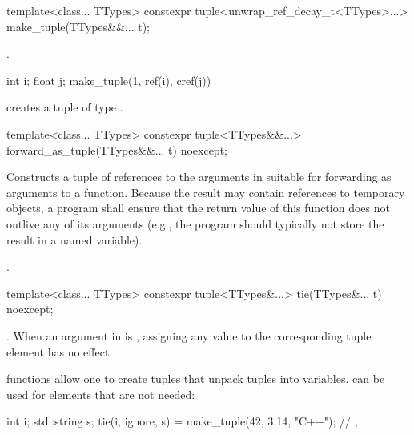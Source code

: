 %
%
\begin{itemdecl}
template<class... TTypes>
  constexpr tuple<unwrap_ref_decay_t<TTypes>...> make_tuple(TTypes&&... t);
\end{itemdecl}

\begin{itemdescr}
\pnum
\returns
{}.

\pnum
\begin{example}
\begin{codeblock}
int i; float j;
make_tuple(1, ref(i), cref(j))
\end{codeblock}
creates a tuple of type .
\end{example}
\end{itemdescr}

%
%
\begin{itemdecl}
template<class... TTypes>
  constexpr tuple<TTypes&&...> forward_as_tuple(TTypes&&... t) noexcept;
\end{itemdecl}

\begin{itemdescr}
\pnum
\effects
Constructs a tuple of references to the arguments in  suitable
for forwarding as arguments to a function. Because the result may contain references
to temporary objects, a program shall ensure that the return value of this
function does not outlive any of its arguments (e.g., the program should typically
not store the result in a named variable).

\pnum
\returns
{}.
\end{itemdescr}

%
%
%
\begin{itemdecl}
template<class... TTypes>
  constexpr tuple<TTypes&...> tie(TTypes&... t) noexcept;
\end{itemdecl}

\begin{itemdescr}
\pnum
\returns
{}.  When an
argument in  is , assigning
any value to the corresponding tuple element has no effect.

\pnum
\begin{example}
 functions allow one to create tuples that unpack
tuples into variables.  can be used for elements that
are not needed:
\begin{codeblock}
int i; std::string s;
tie(i, ignore, s) = make_tuple(42, 3.14, "C++");
// , 
\end{codeblock}
\end{example}
\end{itemdescr}

